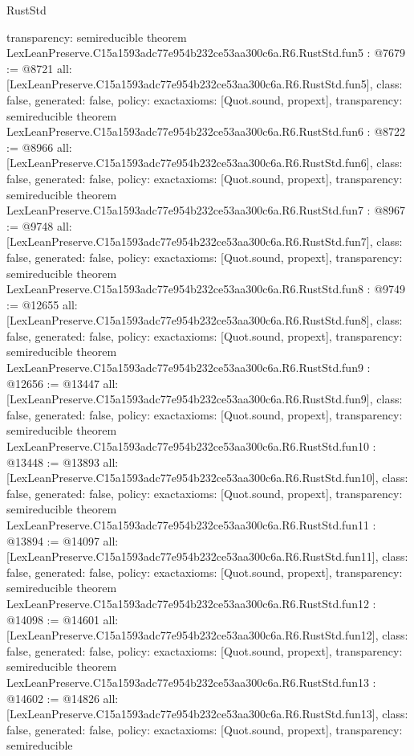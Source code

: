 \begin{lexlean}{RustStd}
\begin{coremodule}
{  transparency: semireducible
}
theorem LexLeanPreserve.C15a1593adc77e954b232ce53aa300c6a.R6.RustStd.fun5 : @7679 := @8721 {
  all: [LexLeanPreserve.C15a1593adc77e954b232ce53aa300c6a.R6.RustStd.fun5],
  class: false,
  generated: false,
  policy: exact{axioms: [Quot.sound, propext]},
  transparency: semireducible
}
theorem LexLeanPreserve.C15a1593adc77e954b232ce53aa300c6a.R6.RustStd.fun6 : @8722 := @8966 {
  all: [LexLeanPreserve.C15a1593adc77e954b232ce53aa300c6a.R6.RustStd.fun6],
  class: false,
  generated: false,
  policy: exact{axioms: [Quot.sound, propext]},
  transparency: semireducible
}
theorem LexLeanPreserve.C15a1593adc77e954b232ce53aa300c6a.R6.RustStd.fun7 : @8967 := @9748 {
  all: [LexLeanPreserve.C15a1593adc77e954b232ce53aa300c6a.R6.RustStd.fun7],
  class: false,
  generated: false,
  policy: exact{axioms: [Quot.sound, propext]},
  transparency: semireducible
}
theorem LexLeanPreserve.C15a1593adc77e954b232ce53aa300c6a.R6.RustStd.fun8 : @9749 := @12655 {
  all: [LexLeanPreserve.C15a1593adc77e954b232ce53aa300c6a.R6.RustStd.fun8],
  class: false,
  generated: false,
  policy: exact{axioms: [Quot.sound, propext]},
  transparency: semireducible
}
theorem LexLeanPreserve.C15a1593adc77e954b232ce53aa300c6a.R6.RustStd.fun9 : @12656 := @13447 {
  all: [LexLeanPreserve.C15a1593adc77e954b232ce53aa300c6a.R6.RustStd.fun9],
  class: false,
  generated: false,
  policy: exact{axioms: [Quot.sound, propext]},
  transparency: semireducible
}
theorem LexLeanPreserve.C15a1593adc77e954b232ce53aa300c6a.R6.RustStd.fun10 : @13448 := @13893 {
  all: [LexLeanPreserve.C15a1593adc77e954b232ce53aa300c6a.R6.RustStd.fun10],
  class: false,
  generated: false,
  policy: exact{axioms: [Quot.sound, propext]},
  transparency: semireducible
}
theorem LexLeanPreserve.C15a1593adc77e954b232ce53aa300c6a.R6.RustStd.fun11 : @13894 := @14097 {
  all: [LexLeanPreserve.C15a1593adc77e954b232ce53aa300c6a.R6.RustStd.fun11],
  class: false,
  generated: false,
  policy: exact{axioms: [Quot.sound, propext]},
  transparency: semireducible
}
theorem LexLeanPreserve.C15a1593adc77e954b232ce53aa300c6a.R6.RustStd.fun12 : @14098 := @14601 {
  all: [LexLeanPreserve.C15a1593adc77e954b232ce53aa300c6a.R6.RustStd.fun12],
  class: false,
  generated: false,
  policy: exact{axioms: [Quot.sound, propext]},
  transparency: semireducible
}
theorem LexLeanPreserve.C15a1593adc77e954b232ce53aa300c6a.R6.RustStd.fun13 : @14602 := @14826 {
  all: [LexLeanPreserve.C15a1593adc77e954b232ce53aa300c6a.R6.RustStd.fun13],
  class: false,
  generated: false,
  policy: exact{axioms: [Quot.sound, propext]},
  transparency: semireducible
}
\end{coremodule}
\end{lexlean}
